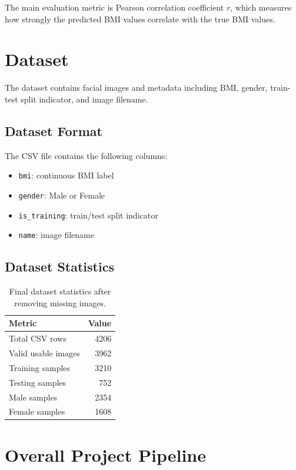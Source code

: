 \documentclass[11pt]{article}
\begin{document}
The main evaluation metric is Pearson correlation coefficient \(r\), which measures how strongly the predicted BMI values correlate with the true BMI values.

\section{Dataset}

The dataset contains facial images and metadata including BMI, gender, train-test split indicator, and image filename.

\subsection{Dataset Format}

The CSV file contains the following columns:

\begin{itemize}
    \item \texttt{bmi}: continuous BMI label
    \item \texttt{gender}: Male or Female
    \item \texttt{is\_training}: train/test split indicator
    \item \texttt{name}: image filename
\end{itemize}

\subsection{Dataset Statistics}

\begin{table}[H]
\centering
\begin{tabular}{lr}
\toprule
\textbf{Metric} & \textbf{Value} \\
\midrule
Total CSV rows & 4206 \\
Valid usable images & 3962 \\
Training samples & 3210 \\
Testing samples & 752 \\
Male samples & 2354 \\
Female samples & 1608 \\
\bottomrule
\end{tabular}
\caption{Final dataset statistics after removing missing images.}
\end{table}

\section{Overall Project Pipeline}
\end{document}
